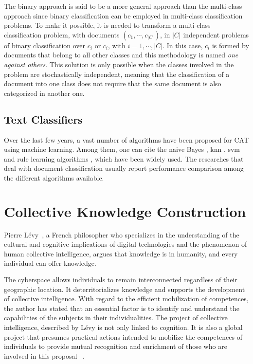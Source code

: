 The binary approach is said to be a more general approach than the multi-class approach since binary classification can be employed in multi-class classification problems.  To make it possible, it is needed to transform a multi-class classification problem, with documents $(c_1, \cdots, c_{ |C|})$, in $|C|$ independent problems of binary classification over $c_i$ or $\overline{c_i}$, with $i=1,\cdots,|C|$. In this case, $\overline{c_i}$ is formed by documents that belong to all other classes and this methodology is named \textit{one against others}. This solution is only possible when the classes involved in the problem are stochastically independent, meaning that the classification of a document into one class does not require that the same document is also categorized in another one.


\subsection{\hspace*{3pt}Text Classifiers}
\label{sec:text-classifiers}

Over the last few years, a vast number of algorithms have been proposed for CAT using machine learning. Among them, one can cite the naive Bayes \cite{mccallum1998comparison}, \gls{knn} \cite{Rijsbergen:1979}, \gls{svm} \cite{joachims1998text} and rule learning algorithms \cite{slattery1998combining}, which have been widely used. The researches that deal with document classification usually report performance comparison among the different algorithms available.




\section{\hspace*{3pt} Collective Knowledge Construction}

Pierre Lévy~\cite{levy1997collective}, a French philosopher who specializes in the understanding of the cultural and cognitive implications of digital technologies and the phenomenon of human collective intelligence, argues that knowledge is in humanity, and every individual can offer knowledge.

The cyberspace allows individuals to remain interconnected regardless of their geographic location. It deterritorializes knowledge and supports the development of collective intelligence. With regard to the efficient mobilization of competences, the author has stated that an essential factor is to identify and understand the capabilities of the subjects in their individualities. The project of collective intelligence, described by Lévy is not only linked to cognition.  It is also a global project that presumes practical actions intended to mobilize the competences of individuals to provide mutual recognition and enrichment of those who are involved in this proposal ~\cite{levy1997collective}.


